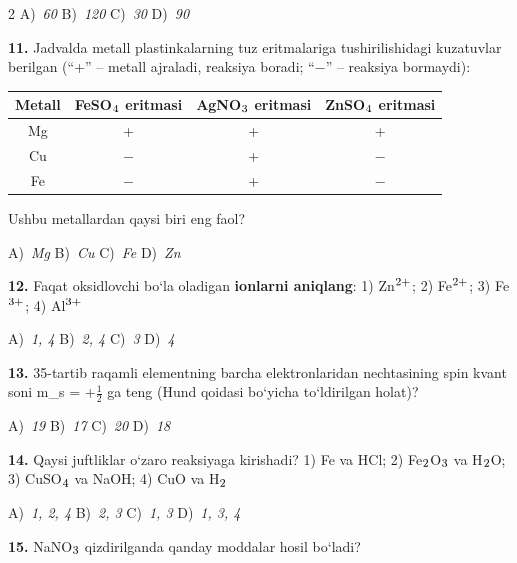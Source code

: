 \documentclass[11pt,a4paper]{article}
\renewcommand{\textsubscript}[1]{\ensuremath{_{\text{\fontsize{8}{8}\selectfont #1}}}}
\renewcommand{\textsuperscript}[1]{\ensuremath{^{\text{\fontsize{8}{8}\selectfont #1}}}}
\begin{document}
\begin{multicols}{2}
\noindent A)~\textsl{60} \hfill B)~\textsl{120} \hfill C)~\textsl{30} \hfill D)~\textsl{90}\par
\vspace{4pt}
\noindent\textbf{11.} Jadvalda metall plastinkalarning tuz eritmalariga tushirilishidagi kuzatuvlar berilgan (``+'' -- metall ajraladi, reaksiya boradi; ``$-$'' -- reaksiya bormaydi):
\begin{center}
\renewcommand{\arraystretch}{1.15}
\begin{tabular}{|c|c|c|c|}\hline
\textbf{Metall} & \textbf{FeSO\textsubscript{4} eritmasi} & \textbf{AgNO\textsubscript{3} eritmasi} & \textbf{ZnSO\textsubscript{4} eritmasi} \\ \hline
Mg & + & + & + \\ \hline
Cu & $-$ & + & $-$ \\ \hline
Fe & $-$ & + & $-$ \\ \hline
\end{tabular}
\end{center}
Ushbu metallardan qaysi biri eng faol?

\noindent A)~\textsl{Mg} \hfill B)~\textsl{Cu} \hfill C)~\textsl{Fe} \hfill D)~\textsl{Zn}\par
\vspace{4pt}
\noindent\textbf{12.} Faqat oksidlovchi bo`la oladigan \textbf{ionlarni aniqlang}: 1) Zn\textsuperscript{2+}; 2) Fe\textsuperscript{2+}; 3) Fe\textsuperscript{3+}; 4) Al\textsuperscript{3+}

\noindent A)~\textsl{1, 4} \hfill B)~\textsl{2, 4} \hfill C)~\textsl{3} \hfill D)~\textsl{4}\par
\vspace{4pt}
\noindent\textbf{13.} 35-tartib raqamli elementning barcha elektronlaridan nechtasining spin kvant soni m\_s = +$\frac{1}{2}$ ga teng (Hund qoidasi bo`yicha to`ldirilgan holat)?

\noindent A)~\textsl{19} \hfill B)~\textsl{17} \hfill C)~\textsl{20} \hfill D)~\textsl{18}\par
\vspace{4pt}
\noindent\textbf{14.} Qaysi juftliklar o`zaro reaksiyaga kirishadi? 1) Fe va HCl; 2) Fe\textsubscript{2}O\textsubscript{3} va H\textsubscript{2}O; 3) CuSO\textsubscript{4} va NaOH; 4) CuO va H\textsubscript{2}

\noindent A)~\textsl{1, 2, 4} \hfill B)~\textsl{2, 3} \hfill C)~\textsl{1, 3} \hfill D)~\textsl{1, 3, 4}\par
\vspace{4pt}
\noindent\textbf{15.} NaNO\textsubscript{3} qizdirilganda qanday moddalar hosil bo`ladi?


\end{multicols}
\end{document}
